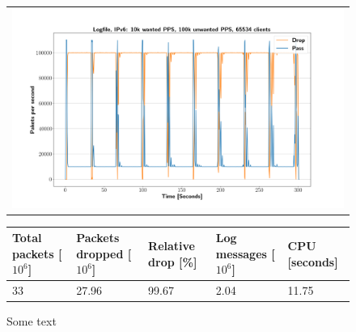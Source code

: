 \begin{figure}[p]
	\label{fig:simplefail2ban:disk:ip6:100k}
	\centering
	\scriptsize
	\begin{tabular}{c}
    	\centerline{\includegraphics[width=1.2\textwidth]{images/simplefail2ban_disk_ipv6_v10k_iv100k_c65534.png}}
	\end{tabular}
	\begin{tabular}{lllll}
		\toprule
		\textbf{Total packets [$10^6$]} & \textbf{Packets dropped [$10^6$]} & \textbf{Relative drop [\%]} & \textbf{Log messages [$10^6$]} & \textbf{CPU [seconds]} \\ \midrule 
		33 & 27.96 & 99.67 & 2.04 & 11.75 \\
		\bottomrule
	\end{tabular}
	\caption[Simplefail2ban, Logfile IPv6, 100k \ac{PPS}]{Some text}
\end{figure}

